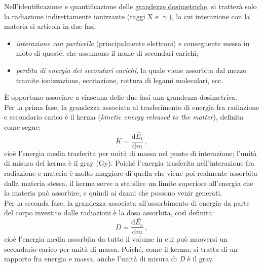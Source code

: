 \documentclass{report}
\numberwithin{equation}{section}
\numberwithin{figure}{section}
\begin{document}
Nell'identificazione e quantificazione delle \underline{grandezze dosimetriche}, si tratterà solo la radiazione indirettamente ionizzante (raggi X e $\upgamma$), la cui interazione con la materia si articola in due fasi:
\begin{itemize}[label=$-$]
    \item \emph{interazione con particelle} (principalmente elettroni) e conseguente messa in moto di queste, che assumono il nome di secondari carichi;
    \item \emph{perdita di energia dei secondari carichi}, la quale viene assorbita dal mezzo tramite ionizzazione, eccitazione, rottura di legami molecolari, ecc.
\end{itemize}
È opportuno associare a ciascuna delle due fasi una grandezza dosimetrica.\\
Per la prima fase, la grandezza associata al trasferimento di energia fra radiazione e secondario carico è il kerma (\textit{kinetic energy released to the matter}), definita come segue:
\begin{equation}
    K = \frac{\mathrm{d}\bar{E_\mathrm{t}}}{\mathrm{d}m}\,,
\end{equation}
cioè l'energia media trasferita per unità di massa nel punto di interazione; l'unità di misura del kerma è il gray (Gy). Poiché l'energia trasferita nell'interazione fra radiazione e materia è molto maggiore di quella che viene poi realmente assorbita dalla materia stessa, il kerma serve a stabilire un limite superiore all'energia che la materia può assorbire, e quindi ai danni che possono venir generati.\\
Per la seconda fase, la grandezza associata all'assorbimento di energia da parte del corpo investito dalle radiazioni è la dosa assorbita, così definita:
\begin{equation}
    D = \frac{\mathrm{d}\bar{E_\mathrm{a}}}{\mathrm{d}m}\,,
\end{equation}
cioè l'energia media assorbita da tutto il volume in cui può muoversi un secondario carico per unità di massa. Poiché, come il kerma, si tratta di un rapporto fra energia e massa, anche l'unità di misura di \textit{D} è il gray.
\end{document}
